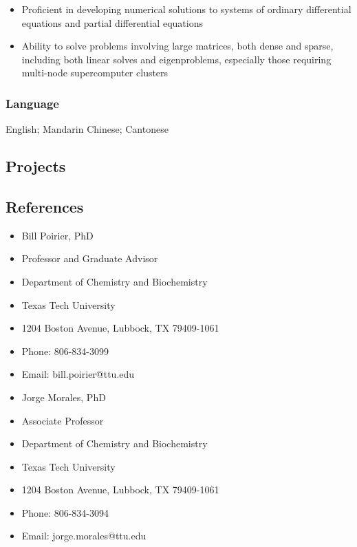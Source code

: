 \documentclass[
]{article}
\providecommand{\tightlist}{%
  \setlength{\itemsep}{0pt}\setlength{\parskip}{0pt}}
\begin{document}
\begin{itemize}
\tightlist
\item
  Proficient in developing numerical solutions to systems of ordinary
  differential equations and partial differential equations
\item
  Ability to solve problems involving large matrices, both dense and
  sparse, including both linear solves and eigenproblems, especially
  those requiring multi-node supercomputer clusters
\end{itemize}

\hypertarget{language}{%
\subsubsection{Language}\label{language}}

English; Mandarin Chinese; Cantonese

\hypertarget{projects}{%
\subsection{Projects}\label{projects}}

\hypertarget{references}{%
\subsection{References}\label{references}}

\begin{itemize}
\tightlist
\item
  Bill Poirier, PhD
\item
  Professor and Graduate Advisor
\item
  Department of Chemistry and Biochemistry
\item
  Texas Tech University
\item
  1204 Boston Avenue, Lubbock, TX 79409-1061
\item
  Phone: 806-834-3099
\item
  Email: bill.poirier@ttu.edu
\end{itemize}

\begin{itemize}
\tightlist
\item
  Jorge Morales, PhD
\item
  Associate Professor
\item
  Department of Chemistry and Biochemistry
\item
  Texas Tech University
\item
  1204 Boston Avenue, Lubbock, TX 79409-1061
\item
  Phone: 806-834-3094
\item
  Email: jorge.morales@ttu.edu
\end{itemize}
\end{document}
